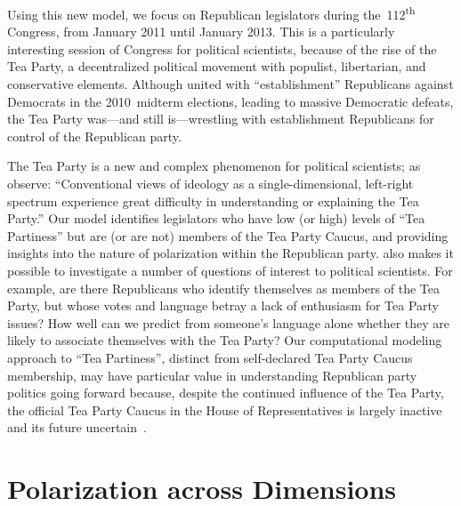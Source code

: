 Using this new model, we focus on Republican legislators during
the~112\textsuperscript{th} \us{} Congress, from January 2011 until
January 2013.  This is a particularly interesting session of Congress
for political scientists, because of the rise of the Tea Party, a
decentralized political movement with populist, libertarian, and
conservative elements.  Although united with ``establishment''
Republicans against Democrats in the 2010~midterm elections,
leading to massive Democratic defeats, the Tea Party was---and still
is---wrestling with establishment Republicans for control of the
Republican party.

The Tea Party is a new and complex phenomenon for political
scientists; as  observe: ``Conventional views
of ideology as a single-dimensional, left-right spectrum experience
great difficulty in understanding or explaining the Tea Party.''  Our
model identifies legislators who have low (or high) levels of ``Tea
Partiness'' but are (or are not) members of the Tea Party Caucus, 
and providing insights into the nature of polarization within the
Republican party. \name{} also makes it possible to investigate a number of questions of interest to
political scientists. For example, are there Republicans who identify
themselves as members of the Tea Party, but whose votes and language
betray a lack of enthusiasm for Tea Party issues?  How well can we
predict from someone's language alone whether they are likely to
associate themselves with the Tea Party?  Our computational modeling approach to ``Tea
Partiness'', distinct from self-declared Tea Party Caucus membership, 
may have particular value in understanding Republican
party politics going forward because, despite the continued
influence of the Tea Party, the official Tea Party Caucus in the
House of Representatives is largely inactive and its future uncertain~\cite{fuller2015}.








\section{Polarization across Dimensions}
\label{subsec:c6_idealpoint_overview}


